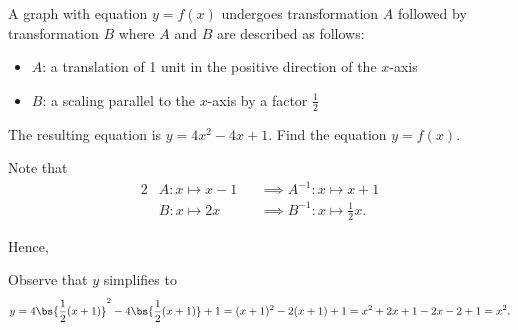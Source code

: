 \begin{solution}
\begin{ppart}
\begin{center}
        \end{center}
    \end{ppart}
\end{solution}

\begin{problem}
    A graph with equation $y = f(x)$ undergoes transformation $A$ followed by transformation $B$ where $A$ and $B$ are described as follows:

    \begin{itemize}
        \item $A$: a translation of 1 unit in the positive direction of the $x$-axis
        \item $B$: a scaling parallel to the $x$-axis by a factor $\frac12$
    \end{itemize}

    The resulting equation is $y = 4x^2-4x+1$. Find the equation $y = f(x)$.
\end{problem}
\begin{solution}
    Note that
    \begin{alignat*}{2}
        &A \colon x \mapsto x-1 &&\implies A^{-1} \colon x \mapsto x+1\\
        &B \colon x \mapsto 2x &&\implies B^{-1} \colon x \mapsto \frac12 x.
    \end{alignat*}

    Hence,
    \begin{center}
    \end{center}

    Observe that $y$ simplifies to \[y = 4\bs{\frac12 (x+1)}^2-4\bs{\frac12 (x+1)}+1 = (x+1)^2-2(x+1)+1 = x^2 + 2x + 1 - 2x - 2 + 1 = x^2.\]
\end{solution}